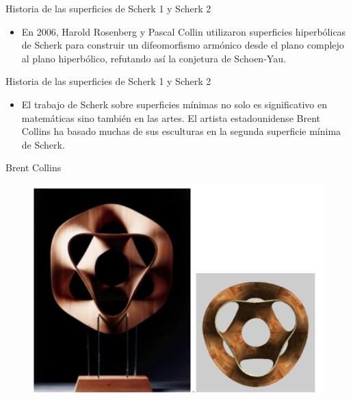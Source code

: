 \documentclass[10pt]{beamer}
\begin{document}
      \begin{frame}{Historia de las superficies de Scherk 1 y Scherk 2}
        \begin{itemize}
          \item En 2006, Harold Rosenberg y Pascal Collin utilizaron superficies hiperbólicas de Scherk para construir un difeomorfismo armónico desde el plano complejo al plano hiperbólico, refutando así la conjetura de Schoen-Yau.
        \end{itemize}
        \end{frame}

        \begin{frame}{Historia de las superficies de Scherk 1 y Scherk 2}
          \begin{itemize}
            \item El trabajo de Scherk sobre superficies mínimas no solo es significativo en matemáticas sino también en las artes. El artista estadounidense Brent Collins ha basado muchas de sus esculturas en la segunda superficie mínima de Scherk.
          \end{itemize}
          \end{frame}

          \begin{frame}{Brent Collins}
            \begin{figure}[H]
              \centering
              \includegraphics[scale=.4]{imagenes/6.png}
              
            \end{figure}
            \end{frame}
\end{document}
